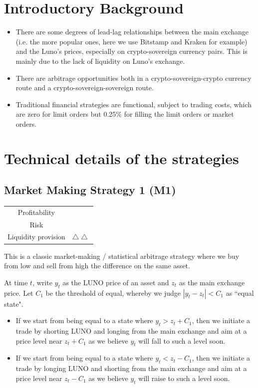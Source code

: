 \documentclass[12pt,a4paper]{article}
\begin{document}
\section{Introductory Background}
 \begin{itemize}
		\item There are some degrees of lead-lag relationships between the main exchange (i.e. the more popular ones, here we use Bitstamp and Kraken for example) and the Luno's prices, especially on crypto-sovereign currency pairs. This is mainly due to the lack of liquidity on Luno's exchange.
		\item There are arbitrage opportunities both in a crypto-sovereign-crypto currency route and a crypto-sovereign-sovereign route. 
		\item Traditional financial strategies are functional, subject to trading costs, which are zero for limit orders but 0.25\% for filling the limit orders or market orders.
	
	\end{itemize}
\vfill
	\pagebreak
	\section{Technical details of the strategies}
		\subsection{Market Making Strategy 1 (M1)}
		\begin{table}[h]
			\centering
		\begin{tabular}{c|c}
			
		Profitability& \textdollaroldstyle \\
		
		Risk & \Radioactivity \\
		
		Liquidity provision &$ \bigtriangleup \bigtriangleup $\\
		
		\end{tabular}
		\end{table}
	
This is a classic market-making / statistical arbitrage strategy where we buy from low and sell from high the difference on the same asset.

At time $t$, write $y_t$ as the LUNO price of an asset and $z_t$ as the main exchange price.
	Let $C_1$ be the threshold of equal, whereby we judge $|y_t-z_t|<C_1$ as ``equal state".
\begin{itemize}
	\item 	If we start from being equal to a state where $y_t>z_t+C_1$, then we initiate a trade by shorting LUNO and longing from the main exchange and aim at a price level near $z_t+C_1$ as we believe $y_t$ will fall to such a level soon.
	\item If we start from being equal to a state where  $y_t< z_t -C_1$, then we initiate a trade by longing LUNO and shorting from the main exchange and aim at a price level near $z_t-C_1$ as we believe $y_t$ will raise to such a level soon.
\end{itemize}
\end{document}
